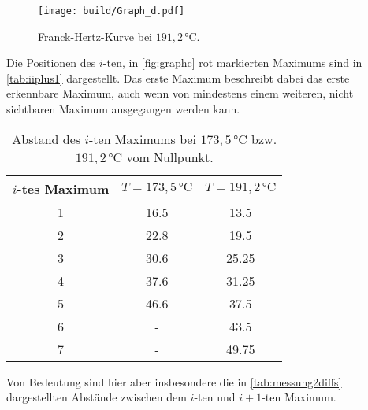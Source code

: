 \begin{figure}[H]
  \centering
  \texttt{[image: build/Graph\_d.pdf]}
  \caption{Franck-Hertz-Kurve bei $191,2 \,\unit{\celsius}$.}
  \label{fig:graphd}
\end{figure}

Die Positionen des $i$-ten, in \autoref{fig:graphc} rot markierten Maximums sind in \autoref{tab:iiplus1} dargestellt.
Das erste Maximum beschreibt dabei das erste erkennbare Maximum, auch wenn von mindestens einem weiteren, nicht sichtbaren Maximum ausgegangen werden kann.

\begin{table}[H]
    \centering
    \caption{Abstand des $i$-ten Maximums bei $173,5 \,\unit{\celsius}$ bzw. $191,2 \,\unit{\celsius}$ vom Nullpunkt.}
    \label{tab:iiplus1}
    \begin{tabular}{S[table-format = 1.1] S[table-format = 2.1] S[table-format = 2.2]}
      \toprule
      {$i$-tes Maximum} & {$T = 173,5 \,\unit{\celsius}$} & {$T = 191,2 \,\unit{\celsius}$}\\
      \midrule
        {1}               &           {16.5}           &           {13.5}            \\
        {2}               &           {22.8}           &           {19.5}            \\
        {3}               &           {30.6}           &           {25.25}           \\
        {4}               &           {37.6}           &           {31.25}           \\
        {5}               &           {46.6}           &           {37.5}            \\
        {6}               &           {-}              &           {43.5}           \\
        {7}               &           {-}              &           {49.75}          \\
      \bottomrule
    \end{tabular}
\end{table}

Von Bedeutung sind hier aber insbesondere die in \autoref{tab:messung2diffs} dargestellten Abstände zwischen dem $i$-ten und $i + 1$-ten Maximum.

